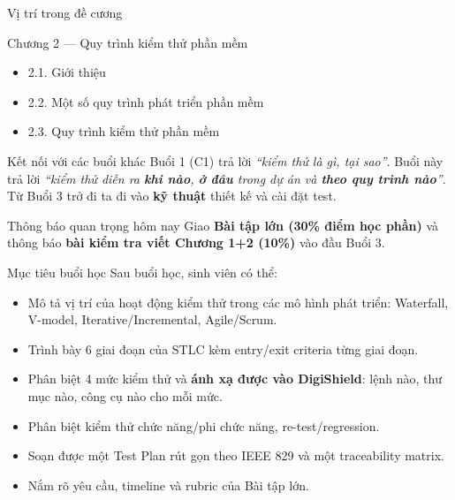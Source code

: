 \documentclass[aspectratio=169,12pt]{beamer}
\begin{document}
\begin{frame}{Vị trí trong đề cương}
  \begin{block}{Chương 2 --- Quy trình kiểm thử phần mềm}
    \begin{itemize}
      \item 2.1. Giới thiệu
      \item 2.2. Một số quy trình phát triển phần mềm
      \item 2.3. Quy trình kiểm thử phần mềm
    \end{itemize}
  \end{block}

  \vspace{0.4em}
  \begin{exampleblock}{Kết nối với các buổi khác}
    \small
    Buổi 1 (C1) trả lời \textit{``kiểm thử là gì, tại sao''}. Buổi này trả lời
    \textit{``kiểm thử diễn ra \textbf{khi nào}, \textbf{ở đâu} trong dự án và
    \textbf{theo quy trình nào}''}. Từ Buổi 3 trở đi ta đi vào \textbf{kỹ thuật}
    thiết kế và cài đặt test.
  \end{exampleblock}

  \vspace{0.3em}
  \begin{alertblock}{Thông báo quan trọng hôm nay}
    Giao \textbf{Bài tập lớn (30\% điểm học phần)} và thông báo
    \textbf{bài kiểm tra viết Chương 1+2 (10\%)} vào đầu Buổi 3.
  \end{alertblock}
\end{frame}

\begin{frame}{Mục tiêu buổi học}
  Sau buổi học, sinh viên có thể:
  \begin{itemize}
    \item Mô tả vị trí của hoạt động kiểm thử trong các mô hình phát triển:
          Waterfall, V-model, Iterative/Incremental, Agile/Scrum.
    \item Trình bày 6 giai đoạn của STLC kèm entry/exit criteria từng giai đoạn.
    \item Phân biệt 4 mức kiểm thử và \textbf{ánh xạ được vào DigiShield}:
          lệnh nào, thư mục nào, công cụ nào cho mỗi mức.
    \item Phân biệt kiểm thử chức năng/phi chức năng, re-test/regression.
    \item Soạn được một Test Plan rút gọn theo IEEE 829 và một traceability matrix.
    \item Nắm rõ yêu cầu, timeline và rubric của Bài tập lớn.
  \end{itemize}
\end{frame}
\end{document}
